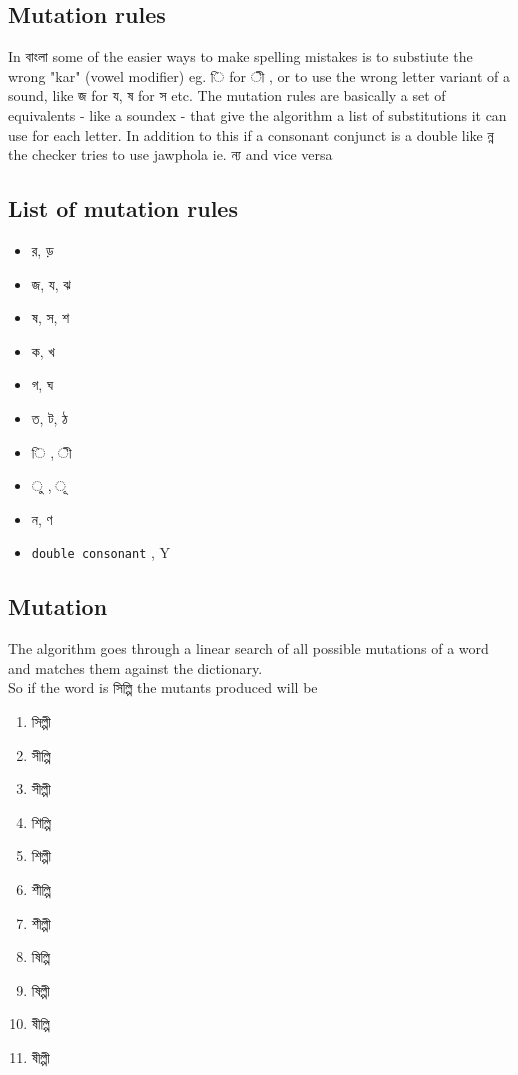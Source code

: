 \documentclass[11pt]{article}
\begin{document}
\subsection{Mutation rules}
In {\bng বাংলা} some of the easier ways to make spelling mistakes is to substiute the wrong "kar" (vowel modifier) eg. {\bng ি} for {\bng ী} , or to use the wrong letter variant of a sound, like {\bng জ} for {\bng য},  {\bng ষ} for {\bng স} etc. 
The mutation rules are basically a set of equivalents - like a soundex - that give the algorithm a list of substitutions it can use for each letter.
In addition to this if a consonant conjunct is a double like {\bng ন্ন} the checker tries to use jawphola ie. {\bng ন্য} and vice versa

\subsection{List of mutation rules}
{\Lbng
\begin{itemize}
\item র, ড়
\item জ, য, ঝ
\item ষ, স, শ
\item ক, খ
\item গ, ঘ
\item ত, ট, ঠ
\item ি , ী
\item  ু , ূ
\item ন, ণ
\item {\tt double consonant} , Y
\end{itemize}
}

\subsection{Mutation}
The algorithm goes through a linear search of all possible mutations of a word and matches them against the dictionary. \\
So if the word is {\bng সিল্পি} the mutants produced will be
{\lbng
\begin{enumerate}
\item সিল্পী
\item সীল্পি
\item সীল্পী
\item শিল্পি
\item শিল্পী
\item শীল্পি
\item শীল্পী
\item ষিল্পি
\item ষিল্পী
\item ষীল্পি
\item ষীল্পী
\end{enumerate}
}
\end{document}
